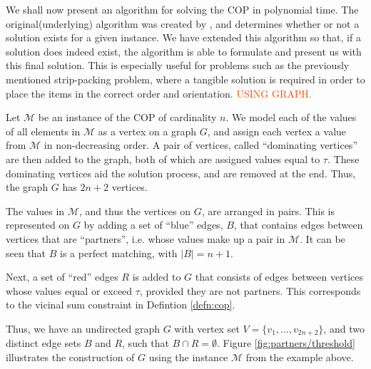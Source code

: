 \documentclass[oribibl]{llncs}
\begin{document}
We shall now present an algorithm for solving the COP in polynomial time. The original(underlying) algorithm was created by \cite{becker2010}, and determines whether or not a solution exists for a given instance. We have extended this algorithm so that, if a solution does indeed exist, the algorithm is able to formulate and present us with this final solution. This is especially useful for problems such as the previously mentioned strip-packing problem, where a tangible solution is required in order to place the items in the correct order and orientation. \textcolor{OrangeRed}{USING GRAPH.}


Let $\mathcal{M}$ be an instance of the COP of cardinality $n$. We model each of the values of all elements in $\mathcal{M}$ as a vertex on a graph $G$, and assign each vertex a value from $\mathcal{M}$ in non-decreasing order. A pair of vertices, called ``dominating vertices'' are then added to the graph, both of which are assigned values equal to $\tau$. These dominating vertices aid the solution process, and are removed at the end. Thus, the graph $G$ has $2n+2$ vertices.


The values in $\mathcal{M}$, and thus the vertices on $G$, are arranged in pairs. This is represented on $G$ by adding a set of ``blue'' edges, $B$, that contains edges between vertices that are ``partners'', i.e. whose values make up a pair in $\mathcal{M}$. It can be seen that $B$ is a perfect matching, with $|B|= n+1$.


Next, a set of ``red'' edges $R$ is added to $G$ that consists of edges between vertices whose values equal or exceed $\tau$, provided they are not partners. This corresponds to the vicinal sum constraint in Defintion \ref{defn:cop}. 


Thus, we have an undirected graph $G$ with vertex set $V = \{v_1, ..., v_{2n+2}\}$, and two distinct edge sets $B$ and $R$, such that $B \cap R = \emptyset$. Figure \ref{fig:partners/threshold} illustrates the construction of $G$ using the instance $\mathcal{M}$ from the example above. 
\end{document}
